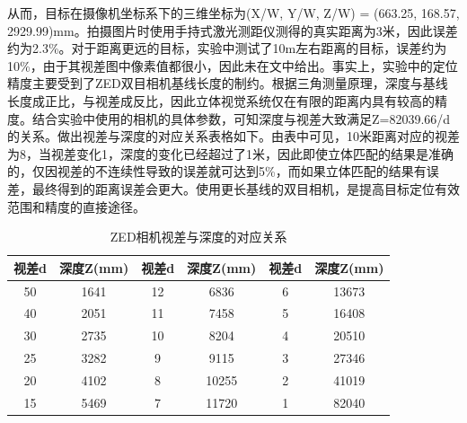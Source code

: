 从而，目标在摄像机坐标系下的三维坐标为(X/W, Y/W, Z/W) = (663.25, 168.57, 2929.99)mm。拍摄图片时使用手持式激光测距仪测得的真实距离为3米，因此误差约为2.3\%。对于距离更远的目标，实验中测试了10m左右距离的目标，误差约为10\%，由于其视差图中像素值都很小，因此未在文中给出。事实上，实验中的定位精度主要受到了ZED双目相机基线长度的制约。根据三角测量原理，深度与基线长度成正比，与视差成反比，因此立体视觉系统仅在有限的距离内具有较高的精度。结合实验中使用的相机的具体参数，可知深度与视差大致满足Z=82039.66/d的关系。做出视差与深度的对应关系表格如下。由表中可见，10米距离对应的视差为8，当视差变化1，深度的变化已经超过了1米，因此即使立体匹配的结果是准确的，仅因视差的不连续性导致的误差就可达到5\%，而如果立体匹配的结果有误差，最终得到的距离误差会更大。使用更长基线的双目相机，是提高目标定位有效范围和精度的直接途径。

\begin{table}[htb] %
	\centering
	\caption{ZED相机视差与深度的对应关系}
	\label{tab:5_ZED相机视差与深度的对应关系}
	\begin{small}
		\begin{tabular}{|cc|cc|cc|}\hline
			视差d & 深度Z(mm) & 视差d & 深度Z(mm) & 视差d & 深度Z(mm) \\\hline
			50      & 1641          & 12      & 6836         & 6        & 13673 \\
			40      & 2051         & 11       & 7458         & 5        & 16408 \\
			30      & 2735         & 10       & 8204        & 4        & 20510 \\
			25      & 3282         & 9        & 9115         & 3        & 27346 \\
			20      & 4102         & 8        & 10255       & 2        & 41019 \\
			15      & 5469         & 7        & 11720        & 1         & 82040 \\
			\hline
		\end{tabular}
	\end{small}
\end{table}



